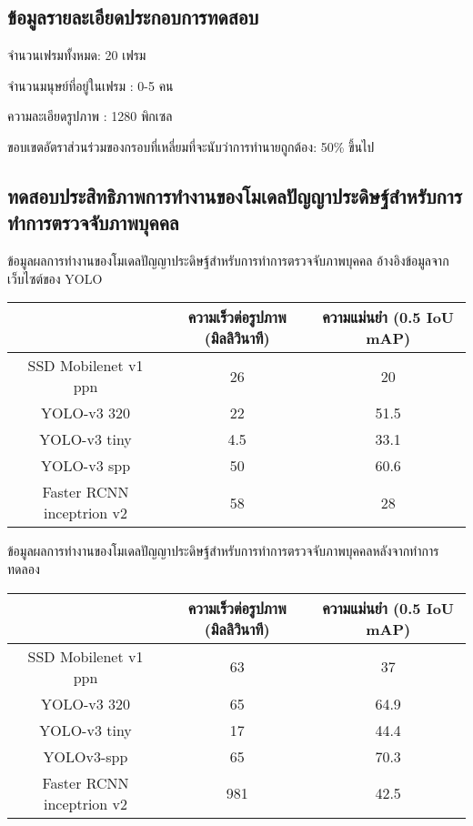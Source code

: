 \subsection{ข้อมูลรายละเอียดประกอบการทดสอบ}
จำนวนเฟรมทั้งหมด: 20 เฟรม

จำนวนมนุษย์ที่อยู่ในเฟรม : 0-5 คน

ความละเอียดรูปภาพ : 1280   พิกเซล

ขอบเขตอัตราส่วนร่วมของกรอบที่เหลี่ยมที่จะนับว่าการทำนายถูกต้อง: 50\% ขึ้นไป


\subsection{ทดสอบประสิทธิภาพการทำงานของโมเดลปัญญาประดิษฐ์สำหรับการทำการตรวจจับภาพบุคคล}
ข้อมูลผลการทำงานของโมเดลปัญญาประดิษฐ์สำหรับการทำการตรวจจับภาพบุคคล อ้างอิงข้อมูลจากเว็บไซต์ของ YOLO
\begin{table}[!ht]
	\begin{tabular}{|c|c|c|}
		\hline
		{}&{ความเร็วต่อรูปภาพ (มิลลิวินาที)}&{ความแม่นยำ (0.5 IoU mAP)}			\\
		\hline
		SSD Mobilenet v1 ppn	 		& 26				& 20														\\
		YOLO-v3 320				& 22				& 51.5				\\	
		YOLO-v3 tiny				& 4.5				& 33.1				\\
		YOLO-v3 spp				& 50				& 60.6				\\	
		Faster RCNN inceptrion v2		& 58				& 28		\\
	\hline
	\end{tabular}
\end{table}

ข้อมูลผลการทำงานของโมเดลปัญญาประดิษฐ์สำหรับการทำการตรวจจับภาพบุคคลหลังจากทำการทดลอง
\begin{table}[!ht]
	\begin{tabular}{|c|c|c|}
		\hline 
		{}&{ความเร็วต่อรูปภาพ (มิลลิวินาที)}&{ความแม่นยำ (0.5 IoU mAP)}			\\
		\hline
		SSD Mobilenet v1 ppn	 					& 63 			& 37			\\
		YOLO-v3 320							& 65			& 64.9		\\
		YOLO-v3 tiny							& 17			& 44.4			\\
		YOLOv3-spp							& 65			& 70.3			\\	
		Faster RCNN inceptrion v2					& 981		& 42.5		\\
		\hline
	\end{tabular}
\end{table}

